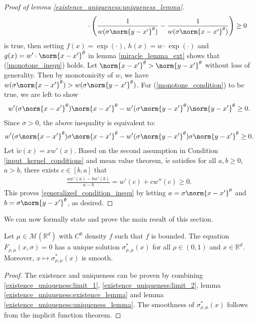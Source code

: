 \begin{proof}[Proof of lemma \ref{existence_uniqueness:uniqueness_lemma}]
\begin{align}
         & \qquad \qquad \qquad \qquad \qquad \qquad \cdot \left(\frac{1}{w(\sigma\norm{y-x'}^{\theta})}-\frac{1}{w(\sigma\norm{x-x'}^{\theta})}\right) \geq 0
    \end{align}
    is true, then setting $f(x) = \exp(\cdot)$, $h(x) = w \cdot \exp(\cdot)$ and $g(x) = w'\cdot \norm{x-x'}^{\theta}$ in lemma \ref{miracle_lemma_ext} shows that (\ref{monotone_inequ}) holds. Let $\norm{x-x'}^{\theta} > \norm{y-x'}^{\theta}$ without loss of generality. Then by monotonicity of $w$, we have $w(\sigma\norm{x-x'}^{\theta})>w(\sigma\norm{y-x'}^{\theta})$. For (\ref{monotone_condition}) to be true, we are left to show
    \begin{align}
        w'(\sigma\norm{x-x'}^{\theta})\norm{x-x'}^{\theta}-w'(\sigma\norm{y-x'}^{\theta})\norm{y-x'}^{\theta} \geq 0.
    \end{align}
    Since $\sigma >0$, the above inequality is equivalent to:
    \begin{align} \label{generalized_condition_inequ}
        w'(\sigma\norm{x-x'}^{\theta})\sigma \norm{x-x'}^{\theta}-w'(\sigma\norm{y-x'}^{\theta}) \sigma \norm{y-x'}^{\theta} \geq 0.
    \end{align}
    Let $\tilde{w}(x) = x w'(x)$. Based on the second assumption in Condition \ref{input_kernel_conditions} and mean value theorem, $\tilde{w}$ satisfies for all $a,b\geq 0$, $a>b$, there exists $c \in [b,a]$ that
    \begin{align}
        \frac{aw'(a) - bw'(b)}{a-b} = w'(c) + cw''(c) \geq 0.
    \end{align}
    This proves \eqref{generalized_condition_inequ} by letting $a = \sigma\norm{x-x'}^{\theta}$ and $b = \sigma\norm{y-x'}^{\theta}$, as desired.
\end{proof}
We can now formally state and prove the main result of this section.
\begin{proposition}
    Let $\mu \in \mathcal{M}(\mathbb{R}^d)$ with $C^0$ density $f$ such that $f$ is bounded. The equation $F_{\rho,\mu}(x,\sigma) = 0$ has a unique solution $\sigma^*_{\rho,\mu}(x)$ for all $\rho \in (0,1)$ and $x \in \mathbb{R}^d$. Moreover, $x \mapsto \sigma^*_{\rho,\mu}(x)$ is smooth.
\end{proposition}
\begin{proof}
    The existence and uniqueness can be proven by combining \eqref{existence_uniqueness:limit_1}, \eqref{existence_uniqueness:limit_2}, lemma \ref{existence_uniqueness:existence_lemma} and lemma \ref{existence_uniqueness:uniqueness_lemma}. The smoothness of $\sigma^*_{\rho,\mu}(x)$ follows from the implicit function theorem.
\end{proof}

